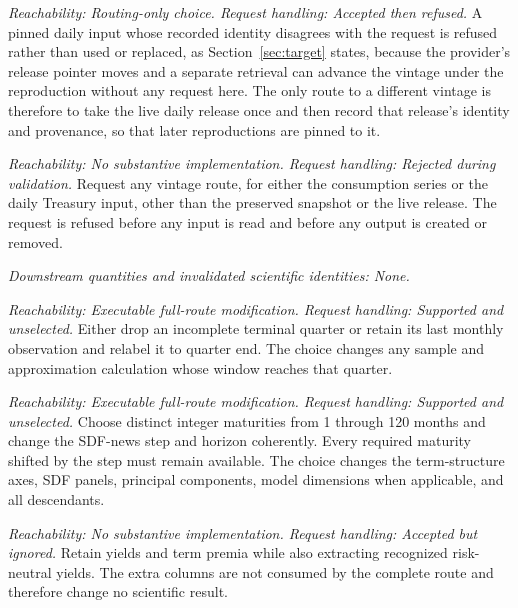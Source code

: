 \documentclass[11pt]{article}
\begin{document}
\begin{description}[style=nextline]
\item[Adopting a new daily input vintage.]
\emph{Reachability: Routing-only choice. Request handling: Accepted then refused.}
A pinned daily input whose recorded identity disagrees with the request is refused rather than used
or replaced, as Section~\ref{sec:target} states, because the provider's release pointer moves and a
separate retrieval can advance the vintage under the reproduction without any request here. The only
route to a different vintage is therefore to take the live daily release once and then record that
release's identity and provenance, so that later reproductions are pinned to it.

\item[Unrecognized input-vintage request.]
\emph{Reachability: No substantive implementation. Request handling: Rejected during validation.}
Request any vintage route, for either the consumption series or the daily Treasury input, other than
the preserved snapshot or the live release. The request is refused before any input is read and
before any output is created or removed.

\emph{Downstream quantities and invalidated scientific identities: None.}

\item[Incomplete terminal quarter.]
\emph{Reachability: Executable full-route modification. Request handling: Supported and unselected.}
Either drop an incomplete terminal quarter or retain its last monthly observation and relabel it to
quarter end. The choice changes any sample and approximation calculation whose window reaches that
quarter.

\item[Treasury maturity grid and news horizon.]
\emph{Reachability: Executable full-route modification. Request handling: Supported and unselected.}
Choose distinct integer maturities from 1 through 120 months and change the SDF-news step and horizon
coherently. Every required maturity shifted by the step must remain available. The choice changes
the term-structure axes, SDF panels, principal components, model dimensions when applicable, and all
descendants.

\item[Additional risk-neutral-yield columns.]
\emph{Reachability: No substantive implementation. Request handling: Accepted but ignored.}
Retain yields and term premia while also extracting recognized risk-neutral yields. The extra columns
are not consumed by the complete route and therefore change no scientific result.


\end{description}
\end{document}
